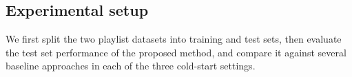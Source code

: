 


\subsection{Experimental setup}

We first split the two playlist datasets into training and test sets, %
then evaluate the test set performance of the proposed method,
and compare it against
several baseline approaches
in each of the three cold-start settings.


